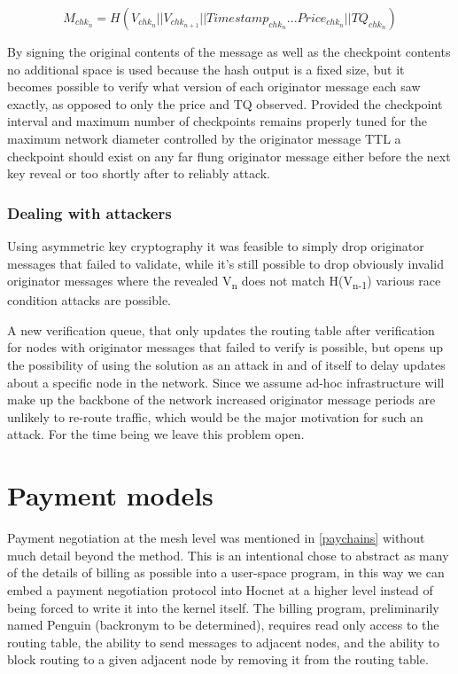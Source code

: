 \documentclass[11pt]{article}
\begin{document}
                        \[M_{chk_n} = H(V_{chk_n}||V_{chk_{n+1}}||Timestamp_{chk_n}...Price_{chk_n}||TQ_{chk_n})\]
                        
                        By signing the original contents of the message as well as the checkpoint contents no additional space is used because the hash output is a fixed size, but it becomes possible to verify what version of each originator message each saw exactly, as opposed to only the price and TQ observed. Provided the checkpoint interval and maximum number of checkpoints remains properly tuned for the maximum network diameter controlled by the originator message TTL a checkpoint should exist on any far flung originator message either before the next key reveal or too shortly after to reliably attack.
                                                
               \subsubsection{Dealing with attackers}
               
                      Using asymmetric key cryptography it was feasible to simply drop originator messages that failed to validate, while it's still possible to drop obviously invalid originator messages where the revealed V\textsubscript{n} does not match H(V\textsubscript{n-1}) various race condition attacks are possible. 
                          
                      A new verification queue, that only updates the routing table after verification for nodes with originator messages that failed to verify is possible, but opens up the possibility of using the solution as an attack in and of itself to delay updates about a specific node in the network. Since we assume ad-hoc infrastructure will make up the backbone of the network increased originator message periods are unlikely to re-route traffic, which would be the major motivation for such an attack. For the time being we leave this problem open.
                
\section{Payment models} \label{pay}

    Payment negotiation at the mesh level was mentioned in \ref{paychains} without much detail beyond the method. This is an intentional chose to abstract as many of the details of billing as possible into a user-space program, in this way we can embed a payment negotiation protocol into Hocnet at a higher level instead of being forced to write it into the kernel itself. The billing program, preliminarily named Penguin (backronym to be determined), requires read only access to the routing table, the ability to send messages to adjacent nodes, and the ability to block routing to a given adjacent node by removing it from the routing table. 
\end{document}
